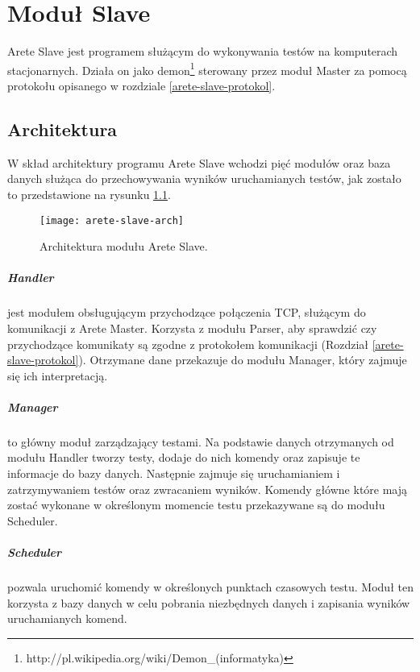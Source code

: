 \documentclass[00-praca-magisterska.tex]{subfiles}
\begin{document}
\chapter{Moduł Slave}
\label{arete-slave}

Arete Slave jest programem służącym do wykonywania testów na komputerach
stacjonarnych. Działa on jako
demon\footnote{http://pl.wikipedia.org/wiki/Demon\_(informatyka)} sterowany
przez moduł Master za pomocą protokołu opisanego w rozdziale
\ref{arete-slave-protokol}.

\section{Architektura}
\label{arete-slave-arch}

W skład architektury programu Arete Slave wchodzi pięć modułów oraz baza danych
służąca do przechowywania wyników uruchamianych testów, jak zostało to
przedstawione na rysunku \ref{fig:arete-slave-arch}.

\begin{figure}[htb]
\begin{center}
\leavevmode
\texttt{[image: arete-slave-arch]}
\end{center}
\caption{Architektura modułu Arete Slave.}
\label{fig:arete-slave-arch}
\end{figure}

\paragraph{Handler} jest modułem obsługującym przychodzące połączenia TCP,
służącym do komunikacji z Arete Master. Korzysta z modułu Parser, aby sprawdzić czy
przychodzące komunikaty są zgodne z protokołem komunikacji (Rozdział
\ref{arete-slave-protokol}). Otrzymane dane przekazuje do modułu Manager, który
zajmuje się ich interpretacją.

\paragraph{Manager} to główny moduł zarządzający testami. Na podstawie danych
otrzymanych od modułu Handler tworzy testy, dodaje do nich komendy oraz zapisuje te
informacje do bazy danych. Następnie zajmuje się uruchamianiem i zatrzymywaniem
testów oraz zwracaniem wyników. Komendy główne które mają zostać wykonane w
określonym momencie testu przekazywane są do modułu Scheduler. 

\paragraph{Scheduler} pozwala uruchomić komendy w określonych punktach czasowych
testu. Moduł ten korzysta z bazy danych w celu pobrania niezbędnych danych i
zapisania wyników uruchamianych komend.
\end{document}
